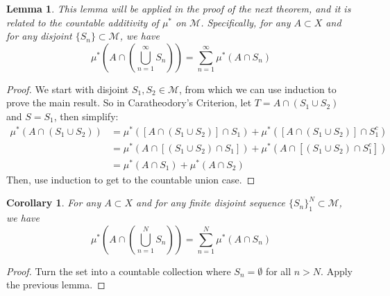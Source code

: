\documentclass[12pt]{article}
\theoremstyle{plain}
\newtheorem{lem}[thm]{Lemma}
\newtheorem{cor}[thm]{Corollary}
\theoremstyle{definition}
\theoremstyle{remark}
\begin{document}
\begin{lem}
\label{caralem}
This lemma will be applied in the proof of the next theorem, and it is related to the countable additivity of $\mu^*$ on $\mathscr{M}$. Specifically, for any $A\subset X$ and for any disjoint $\{S_n\}\subset\mathscr{M}$, we have
\[
    \mu^*\left(A \cap \left(
    \bigcup^\infty_{n=1}S_n\right)\right) = 
    \sum^\infty_{n=1}\mu^*(A\cap S_n)
\]
\end{lem}
\begin{proof}
We start with disjoint $S_1,S_2\in\mathscr{M}$, from which we can use induction to prove the main result. So in Caratheodory's Criterion, let $T=A \cap(S_1\cup S_2)$ and $S=S_1$, then simplify:
\begin{align*}
    \mu^*(A\cap(S_1\cup S_2)) &= 
    \mu^*\left([A\cap(S_1\cup S_2)] \cap S_1\right)
    + \mu^*\left([A\cap(S_1\cup S_2)] \cap S^c_1\right) \\
    &= \mu^*\left(A\cap[(S_1\cup S_2) \cap S_1]\right)
    + \mu^*\left(A\cap[(S_1\cup S_2) \cap S^c_1]\right) \\
    &= \mu^*\left(A\cap S_1 \right)
    + \mu^*\left(A\cap S_2\right) 
\end{align*}
Then, use induction to get to the countable union case.
\end{proof}
\begin{cor}
\label{caralem2}
For any $A\subset X$ and for any finite disjoint sequence $\{S_n\}_1^N\subset\mathscr{M}$, we have
\[
    \mu^*\left(A \cap \left(
    \bigcup^N_{n=1}S_n\right)\right) = 
    \sum^N_{n=1}\mu^*(A\cap S_n)
\]
\end{cor}
\begin{proof}
Turn the set into a countable collection where $S_n = \emptyset$ for all $n>N$. Apply the previous lemma.
\end{proof}
\end{document}
